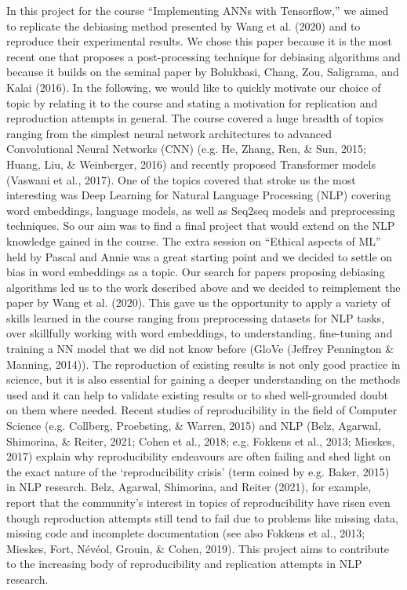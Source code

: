 \documentclass[
  english,
  man,floatsintext]{apa6}
\begin{document}
In this project for the course ``Implementing ANNs with Tensorflow,'' we aimed to replicate the debiasing method presented by Wang et al. (2020) and to reproduce their experimental results. We chose this paper because it is the most recent one that proposes a post-processing technique for debiasing algorithms and because it builds on the seminal paper by Bolukbasi, Chang, Zou, Saligrama, and Kalai (2016).
In the following, we would like to quickly motivate our choice of topic by relating it to the course and stating a motivation for replication and reproduction attempts in general.
The course covered a huge breadth of topics ranging from the simplest neural network architectures to advanced Convolutional Neural Networks (CNN) (e.g. He, Zhang, Ren, \& Sun, 2015; Huang, Liu, \& Weinberger, 2016) and recently proposed Transformer models (Vaswani et al., 2017). One of the topics covered that stroke us the most interesting was Deep Learning for Natural Language Processing (NLP) covering word embeddings, language models, as well as Seq2seq models and preprocessing techniques. So our aim was to find a final project that would extend on the NLP knowledge gained in the course. The extra session on ``Ethical aspects of ML'' held by Pascal and Annie was a great starting point and we decided to settle on bias in word embeddings as a topic. Our search for papers proposing debiasing algorithms led us to the work described above and we decided to reimplement the paper by Wang et al. (2020). This gave us the opportunity to apply a variety of skills learned in the course ranging from preprocessing datasets for NLP tasks, over skillfully working with word embeddings, to understanding, fine-tuning and training a NN model that we did not know before (GloVe (Jeffrey Pennington \& Manning, 2014)).
The reproduction of existing results is not only good practice in science, but it is also essential for gaining a deeper understanding on the methods used and it can help to validate existing results or to shed well-grounded doubt on them where needed. Recent studies of reproducibility in the field of Computer Science (e.g. Collberg, Proebsting, \& Warren, 2015) and NLP (Belz, Agarwal, Shimorina, \& Reiter, 2021; Cohen et al., 2018; e.g. Fokkens et al., 2013; Mieskes, 2017) explain why reproducibility endeavours are often failing and shed light on the exact nature of the `reproducibility crisis' (term coined by e.g. Baker, 2015) in NLP research. Belz, Agarwal, Shimorina, and Reiter (2021), for example, report that the community's interest in topics of reproducibility have risen even though reproduction attempts still tend to fail due to problems like missing data, missing code and incomplete documentation (see also Fokkens et al., 2013; Mieskes, Fort, Névéol, Grouin, \& Cohen, 2019).
This project aims to contribute to the increasing body of reproducibility and replication attempts in NLP research.
\end{document}
